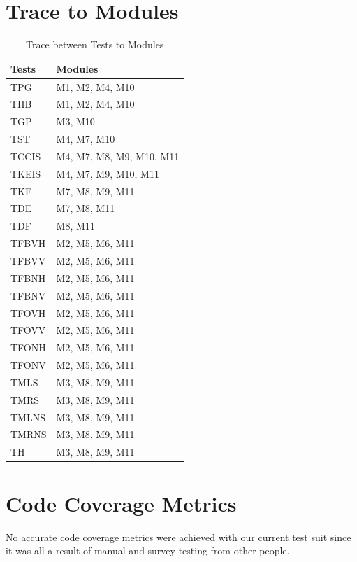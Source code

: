 \documentclass[12pt, titlepage]{article}
\begin{document}
\section{Trace to Modules}
\begin{table}[H]
\begin{tabular}{ll}
\toprule
Tests & Modules \\
\midrule
TPG & M1, M2, M4, M10 \\
THB & M1, M2, M4, M10 \\
TGP & M3, M10 \\
TST & M4, M7, M10 \\
TCCIS & M4, M7, M8, M9, M10, M11 \\
TKEIS & M4, M7, M9, M10, M11 \\
TKE & M7, M8, M9, M11 \\
TDE &  M7, M8, M11 \\
TDF & M8, M11 \\
TFBVH & M2, M5, M6, M11 \\
TFBVV & M2, M5, M6, M11 \\
TFBNH & M2, M5, M6, M11 \\
TFBNV & M2, M5, M6, M11 \\
TFOVH & M2, M5, M6, M11 \\
TFOVV & M2, M5, M6, M11 \\
TFONH & M2, M5, M6, M11 \\
TFONV & M2, M5, M6, M11 \\
TMLS & M3, M8, M9, M11 \\
TMRS & M3, M8, M9, M11 \\
TMLNS & M3, M8, M9, M11 \\
TMRNS & M3, M8, M9, M11 \\
TH & M3, M8, M9, M11\\
\midrule
\end{tabular}
\caption{Trace between Tests to Modules}
\label{Table}
\end{table}	

\section{Code Coverage Metrics}
No accurate code coverage metrics were achieved with our current test suit since it was all a result of manual and survey testing from other people. 




\end{document}
